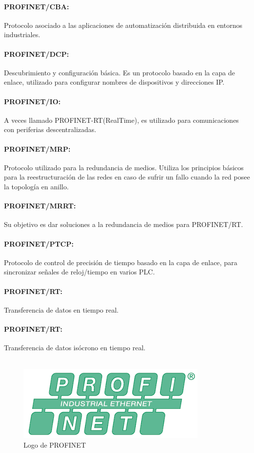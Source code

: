 \documentclass[12pt,titlepage]{article}
\begin{document}
\paragraph*{PROFINET/CBA:} Protocolo asociado a las aplicaciones de automatización distribuida en entornos industriales. 
\paragraph*{PROFINET/DCP:} Descubrimiento y configuración básica. Es un protocolo basado en la capa de enlace, utilizado para configurar nombres de dispositivos y direcciones IP. 
\paragraph*{PROFINET/IO:} A veces llamado PROFINET-RT(RealTime), es utilizado para comunicaciones con periferias descentralizadas.
\paragraph*{PROFINET/MRP:} Protocolo utilizado para la redundancia de medios. Utiliza los principios básicos para la reestructuración de las redes en caso de sufrir un fallo cuando la red posee la topología en anillo.
\paragraph*{PROFINET/MRRT:} Su objetivo es dar soluciones a la redundancia de medios para PROFINET/RT. 
\paragraph*{PROFINET/PTCP:} Protocolo de control de precisión de tiempo basado en la capa de enlace, para sincronizar señales de reloj/tiempo en varios PLC. 
\paragraph*{PROFINET/RT:} Transferencia de datos en tiempo real. 
\paragraph*{PROFINET/RT:} Transferencia de datos isócrono en tiempo real. \\ \\ 

\begin{figure}[htbp]
\hspace*{5.5cm} 
\includegraphics[scale=0.59]{profinet}
\caption{Logo de PROFINET}
\end{figure}
\newpage
\end{document}
